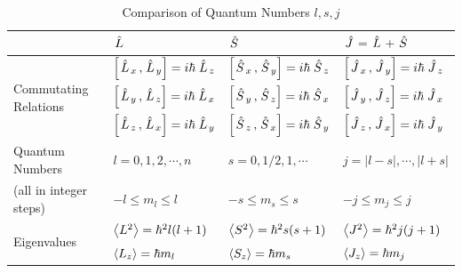 \documentclass{school-22.101-notes}
\begin{document}
\begin{table}[ht]
  \begin{tabular}{|p{1.5in}|p{1.5in}|p{1.5in}|p{1.5in}|} \hline
    & $\left. \hat{L} \right.$ & $\left. \hat{S} \right.$ &$\left. \hat{J} \right. = \left. \hat{L} \right. + \left. \hat{S} \right.$ \\ \hline
    \multirow{3}{*}{Commutating Relations} &
    $\left[ \left. \hat{L} \right._x, \left. \hat{L} \right._y \right] = i \hbar \left. \hat{L} \right._z$ &  $\left[ \left. \hat{S} \right._x, \left. \hat{S} \right._y \right] = i \hbar \left. \hat{S} \right._z$ &  $\left[ \left. \hat{J} \right._x, \left. \hat{J} \right._y \right] = i \hbar \left. \hat{J} \right._z$ \\
    &  $\left[ \left. \hat{L} \right._y, \left. \hat{L} \right._z \right] = i \hbar \left. \hat{L} \right._x$ &  $\left[ \left. \hat{S} \right._y, \left. \hat{S} \right._z \right] = i \hbar \left. \hat{S} \right._x$ &  $\left[ \left. \hat{J} \right._y, \left. \hat{J} \right._z \right] = i \hbar \left. \hat{J} \right._x$ \\
    &  $\left[ \left. \hat{L} \right._z, \left. \hat{L} \right._x \right] = i \hbar \left. \hat{L} \right._y$ &  $\left[ \left. \hat{S} \right._z, \left. \hat{S} \right._x \right] = i \hbar \left. \hat{S} \right._y$ &  $\left[ \left. \hat{J} \right._z, \left. \hat{J} \right._x \right] = i \hbar \left. \hat{J} \right._y$ \\ \hline
    Quantum Numbers & $ l = 0,1,2,\cdots,n $ & $s = 0, 1/2, 1, \cdots$               & $ j =|l-s|,\cdots, |l+s|$ \\
    (all in integer steps) & $-l \le m_l \le l  $  & $ -s \le m_s \le s$  & $-j \le m_j \le j$  \\ \hline
    \multirow{2}{*}{Eigenvalues} 
    & $\left< L^2 \right> = \hbar^2 l (l+1)$ 
    & $\left< S^2 \right> = \hbar^2 s (s+1)$
    & $\left< J^2 \right> = \hbar^2 j(j+1)$\\ 
    & $\left< L_z \right> = \hbar m_l$ 
    & $\left< S_z \right> = \hbar m_s$ 
    & $\left< J_z \right> =  \hbar m_j$  \\ \hline
  \end{tabular}
  \caption{Comparison of Quantum Numbers $l,s,j$} \label{quantum-numbers}
\end{table}
\end{document}
